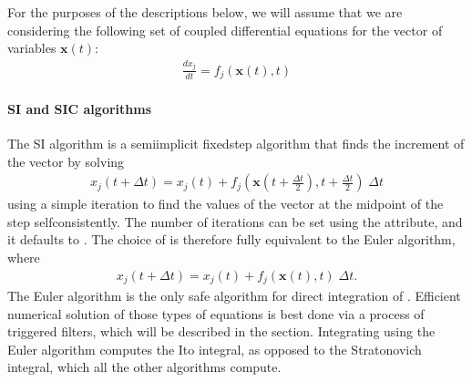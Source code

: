\documentclass[letterpaper,10pt,english]{sphinxmanual}
\begin{document}
\sphinxAtStartPar
For the purposes of the descriptions below, we will assume that we are considering the following set of coupled differential equations for the vector of variables \(\mathbf{x}(t)\):
\begin{equation*}
\begin{split}\frac{d x_j}{dt} = f_j(\mathbf{x}(t),t)\end{split}
\end{equation*}
\ignorespaces 

\paragraph{SI and SIC algorithms}
\label{\detokenize{reference_elements:si-and-sic-algorithms}}\label{\detokenize{reference_elements:si}}\label{\detokenize{reference_elements:index-82}}
\sphinxAtStartPar
The SI algorithm is a semi\sphinxhyphen{}implicit fixed\sphinxhyphen{}step algorithm that finds the increment of the vector by solving
\begin{equation*}
\begin{split}x_j(t+\Delta t) = x_j(t) + f_j\left(\mathbf{x}(t+\frac{\Delta t}{2}),t+\frac{\Delta t}{2}\right) \;\Delta t\end{split}
\end{equation*}
\sphinxAtStartPar
using a simple iteration to find the values of the vector at the midpoint of the step self\sphinxhyphen{}consistently.  The number of iterations can be set using the  attribute, and it defaults to .  The choice of  is therefore fully equivalent to the Euler algorithm, where
\begin{equation*}
\begin{split}x_j(t+\Delta t) = x_j(t) + f_j\left(\mathbf{x}(t),t\right) \;\Delta t.\end{split}
\end{equation*}
\sphinxAtStartPar
The Euler algorithm is the only safe algorithm for direct integration of {\hyperref[\detokenize{reference_elements:jumpnoise}]{}}.  Efficient numerical solution of those types of equations is best done via a process of triggered filters, which will be described in the {\hyperref[\detokenize{advanced_topics:advancedtopics}]{}} section.  Integrating using the Euler algorithm computes the Ito integral, as opposed to the Stratonovich integral, which all the other algorithms compute.
\end{document}
